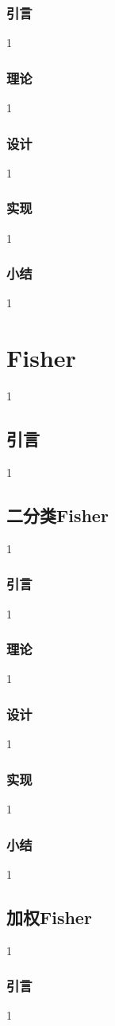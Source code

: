 \documentclass[UTF8, a4paper, 12pt]{report}
\begin{document}
		\subsection{引言}
1
		\subsection{理论}
1
		\subsection{设计}
1
		\subsection{实现}
1
		\subsection{小结}
1
\chapter{Fisher}
1
	\section{引言}
1
	\section{二分类Fisher}
1
		\subsection{引言}
1
		\subsection{理论}
1
		\subsection{设计}
1
		\subsection{实现}
1
		\subsection{小结}
1
	\section{加权Fisher}
1
		\subsection{引言}
1
\end{document}
